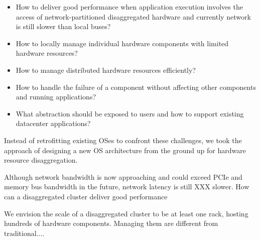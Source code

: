 \documentclass[10pt,times,twocolumn]{z2-article}
\begin{document}
\begin{itemize}
\vspace{-0.05in}
\item How to deliver good performance when application execution involves the access of network-partitioned disaggregated hardware
and currently network is still slower than local buses?

\vspace{-0.05in}
\item How to locally manage individual hardware components with limited hardware resources?


\vspace{-0.05in}
\item How to manage distributed hardware resources efficiently?

\vspace{-0.05in}
\item How to handle the failure of a component without affecting other components and running applications?

\vspace{-0.05in}
\item What abstraction should be exposed to users and how to support existing datacenter applications?

\vspace{-0.05in}
\end{itemize}

Instead of retrofitting existing OSes to confront these challenges,
we took the approach of designing a new OS architecture from the ground up for hardware resource disaggregation.

Although network bandwidth is now approaching and could exceed PCIe and memory bus bandwidth in the
future, network latency is still XXX slower.
How can a disaggregated cluster deliver good performance

We envision the scale of a disaggregated cluster to be at least one rack, 
hosting hundreds of hardware components.
Managing them are different from traditional....
\end{document}
